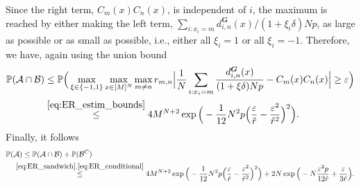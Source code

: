 \documentclass[a4paper,
               10pt,
               pdftex,
               normalheadings,
               headsepline,
               footsepline,
               headinclude,
               footinclude,
               DIV=14,
               abstracton]
{scrartcl}
\newcommand{\rv}[1]{\bm{#1}}
\begin{document}
    Since the right term, $C_m(x) C_n(x)$, is independent of $i$, the maximum is reached by either making the left term, $\sum_{i : x_{i} = m} {d^{\rv{G}}_{i,n}(x)} / {(1 + \xi_i \delta) N p}$, as large as possible or as small as possible, i.e., either all $\xi_i = 1$ or all $\xi_i = -1$.
    Therefore, we have, again using the union bound
    \begin{align}
        \mathbb{P}(\mathcal{A} \cap \mathcal{B}) &\leq \mathbb{P}\Big( \max_{\xi \in \{-1,1\}} \max_{x\in [M]^{N}} \max_{m \neq n} r_{m,n} \Big\lvert \frac{1}{N} \sum_{i : x_{i} = m} \frac{d^{\rv{G}}_{i,n}(x)}{(1 + \xi \delta) N p} - C_m(x) C_n(x) \Big\rvert \geq \varepsilon \Big)  \\
       &\overset{\eqref{eq:ER_estim_bounds}}{\leq} 4 M^{N+2} \exp\Big(-\frac{1}{12} N^2 p \Big(\frac{\varepsilon}{\hat{r}} - \frac{\varepsilon^2}{\hat{r}^2}\Big)^2 \Big). \label{eq:ER_conditional}
    \end{align}
    Finally, it follows
    \begin{align}
        \mathbb{P}(\mathcal{A}) &\leq \mathbb{P}(\mathcal{A} \cap \mathcal{B}) + \mathbb{P}(\mathcal{B}^C)\\
        &\hspace{-2.6ex}\overset{\eqref{eq:ER_sandwich}, \eqref{eq:ER_conditional}}{\leq} 4 M^{N+2} \exp\Big(-\frac{1}{12} N^2 p \Big(\frac{\varepsilon}{\hat{r}} - \frac{\varepsilon^2}{\hat{r}^2}\Big)^2 \Big) + 2 N \exp\Big(-N \frac{\varepsilon^2 p}{12 \hat{r}} + \frac{ \varepsilon}{3\hat{r}}\Big).
    \end{align}
\end{document}
